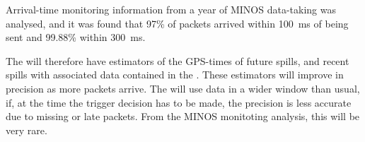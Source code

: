 Arrival-time monitoring information from a year of MINOS data-taking
was analysed, and it was found that 97\% of packets arrived within
\SI{100}{\ms} of being sent and 99.88\% within \SI{300}{\ms}.

The  will therefore have estimators of the GPS-times of
future spills, and recent spills with associated data contained in the
. These estimators will improve in precision as
more packets arrive.  The  will use data in a wider window than
usual, if, at the time the trigger decision has to be made, the
precision is less accurate due to missing or late packets.  From the
MINOS monitoting analysis, this will be very rare.

